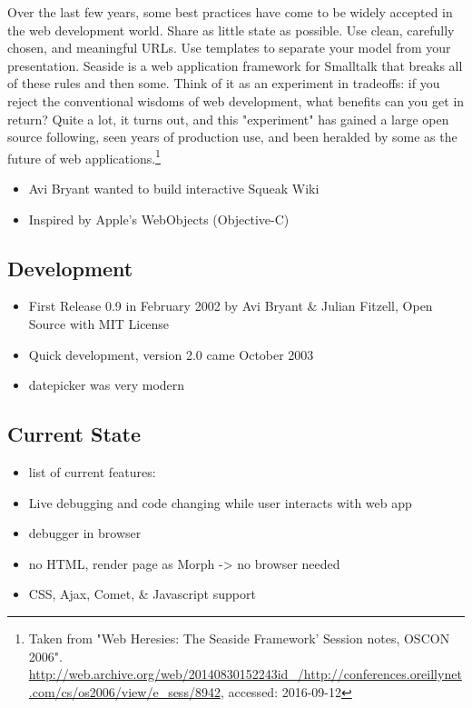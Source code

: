 \documentclass[a4paper,12pt,pagesize,headsepline,bibtotoc,titlepage]{scrartcl}
\begin{document}
Over the last few years, some best practices have come to be widely accepted in the web development world. Share as little state as possible. Use clean, carefully chosen, and meaningful URLs. Use templates to separate your model from your presentation.
Seaside is a web application framework for Smalltalk that breaks all of these rules and then some. Think of it as an experiment in tradeoffs: if you reject the conventional wisdoms of web development, what benefits can you get in return? Quite a lot, it turns out, and this "experiment" has gained a large open source following, seen years of production use, and been heralded by some as the future of web applications.\footnote{Taken from "Web Heresies: The Seaside Framework' Session notes, OSCON 2006". \url{http://web.archive.org/web/20140830152243id\_/http://conferences.oreillynet.com/cs/os2006/view/e_sess/8942}, accessed: 2016-09-12}


\begin{itemize}
\item Avi Bryant wanted to build interactive Squeak Wiki
\item Inspired by Apple’s WebObjects (Objective-C)
\end{itemize}

\subsection{Development}
\label{sec:dev} 


\begin{itemize}
\item First Release 0.9 in February 2002 by Avi Bryant \& Julian Fitzell, Open Source with MIT License
\item Quick development, version 2.0 came October 2003
\item datepicker was very modern
\end{itemize}

\subsection{Current State}
\label{sec:current} 

\begin{itemize}
\item list of current features:
\item Live debugging and code changing while user interacts with web app
\item debugger in browser
\item no HTML, render page as Morph -> no browser needed
\item CSS, Ajax, Comet, \& Javascript support
\end{itemize}
\end{document}
